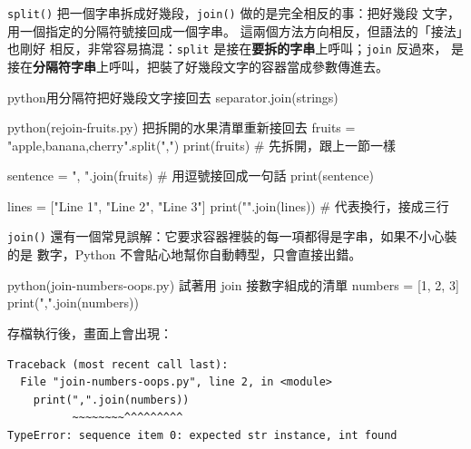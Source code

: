 \texttt{split()} 把一個字串拆成好幾段，\texttt{join()} 做的是完全相反的事：把好幾段
文字，用一個指定的分隔符號接回成一個字串。
這兩個方法方向相反，但語法的「接法」也剛好
相反，非常容易搞混：\texttt{split} 是接在\textbf{要拆的字串}上呼叫；\texttt{join} 反過來，
是接在\textbf{分隔符字串}上呼叫，把裝了好幾段文字的容器當成參數傳進去。

\begin{code}{python}{用分隔符把好幾段文字接回去}
separator.join(strings)
\end{code}

\begin{example}{python}{(rejoin-fruits.py) 把拆開的水果清單重新接回去}
fruits = "apple,banana,cherry".split(",")
print(fruits)                    # 先拆開，跟上一節一樣

sentence = ", ".join(fruits)      # 用逗號接回成一句話
print(sentence)

lines = ["Line 1", "Line 2", "Line 3"]
print("\n".join(lines))           # \n 代表換行，接成三行
\end{example}



\texttt{join()} 還有一個常見誤解：它要求容器裡裝的每一項都得是字串，如果不小心裝的是
數字，Python 不會貼心地幫你自動轉型，只會直接出錯。

\begin{example}{python}{(join-numbers-oops.py) 試著用 join 接數字組成的清單}
numbers = [1, 2, 3]
print(",".join(numbers))
\end{example}

存檔執行後，畫面上會出現：

\begin{verbatim}
Traceback (most recent call last):
  File "join-numbers-oops.py", line 2, in <module>
    print(",".join(numbers))
          ~~~~~~~~^^^^^^^^^
TypeError: sequence item 0: expected str instance, int found
\end{verbatim}

